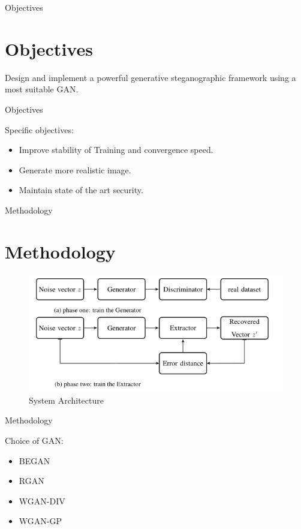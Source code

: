 \documentclass[11pt]{beamer}
\begin{document}
\begin{frame}{Objectives}
	\section{Objectives}
	Design and implement a powerful generative steganographic framework using a
most suitable GAN.
\end{frame}

\begin{frame}{Objectives}
	
	Specific objectives:
	\begin{itemize}
		\item Improve stability of Training and convergence speed.
		\item Generate more realistic image.
		\item Maintain state of the art security.
	\end{itemize}
	
\end{frame}

\begin{frame}{Methodology}
	\section{Methodology}
	\begin{figure}
		\includegraphics[scale=.45]{arch}
		\caption{System Architecture}
	\end{figure}
\end{frame}

\begin{frame}{Methodology}

	Choice of GAN: 
	\begin{itemize}
		\item BEGAN
		\item RGAN
		\item WGAN-DIV
		\item WGAN-GP
	\end{itemize}
\end{frame}
\end{document}
